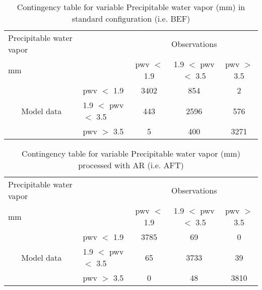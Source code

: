 \documentclass[11pt,english]{article}
\begin{document}
\begin{table}[]
\begin{center}
\begin{tabular}{llccc}
\hline
{Precipitable water vapor}                                       &                                                    & \multicolumn{3}{c}{Observations}                 \\
{mm}                                       &                             & pwv $<$ 1.9   & 1.9 $<$ pwv $<$ 3.5 & pwv $>$ 3.5 \\
\hline
\multicolumn{1}{c}{\multirow{3}{*}{Model data}}  & pwv $<$ 1.9             & 3402                & 854                       & 2              \\
                                                 & 1.9  $<$ pwv $<$ 3.5 & 443                & 2596                       & 576              \\
                                                 & pwv $>$ 3.5             & 5                & 400                       & 3271              \\
\hline
\end{tabular}
\end{center}
\caption{Contingency table for variable Precipitable water vapor (mm) in standard configuration (i.e. BEF)}
\label{tab:contingencypwvBEF}
\end{table}
\begin{table}[]
\begin{center}
\begin{tabular}{llccc}
\hline
{Precipitable water vapor}                                       &                                                    & \multicolumn{3}{c}{Observations}                 \\
{mm}                                       &                             & pwv $<$ 1.9   & 1.9 $<$ pwv $<$ 3.5 & pwv $>$ 3.5 \\
\hline
\multicolumn{1}{c}{\multirow{3}{*}{Model data}}  & pwv $<$ 1.9             & 3785                & 69                       & 0              \\
                                                 & 1.9  $<$ pwv $<$ 3.5 & 65                & 3733                       & 39              \\
                                                 & pwv $>$ 3.5             & 0                & 48                       & 3810              \\
\hline
\end{tabular}
\end{center}
\caption{Contingency table for variable Precipitable water vapor (mm) processed with AR (i.e. AFT)}
\label{tab:contingencypwvAFT}
\end{table}
\end{document}
